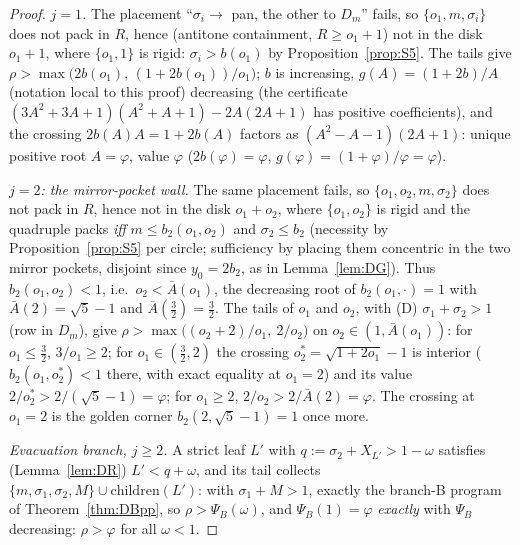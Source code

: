 \documentclass[10pt,a4paper]{amsart}
\begin{document}
\begin{proof}
\emph{$j=1$.} The placement ``$\sigma_i\to$ pan, the other to $D_m$''
fails, so $\{o_1,m,\sigma_i\}$ does not pack in $R$, hence (antitone
containment, $R\ge o_1+1$) not in the disk $o_1+1$, where
$\{o_1,1\}$ is rigid: $\sigma_i>b(o_1)$ by
Proposition~\ref{prop:S5}. The tails give
$\rho>\max\bigl(2b(o_1),\,(1+2b(o_1))/o_1\bigr)$; $b$ is increasing,
$g(A)=(1+2b)/A$ (notation local to this proof) decreasing (the certificate
$(3A^2+3A+1)(A^2+A+1)-2A(2A+1)$ has positive coefficients), and the
crossing $2b(A)A=1+2b(A)$ factors as $(A^2-A-1)(2A+1)$: unique positive
root $A=\varphi$, value $\varphi$ ($2b(\varphi)=\varphi$,
$g(\varphi)=(1+\varphi)/\varphi=\varphi$).

\emph{$j=2$: the mirror-pocket wall.} The same placement fails, so
$\{o_1,o_2,m,\sigma_2\}$ does not pack in $R$, hence not in the disk
$o_1+o_2$, where $\{o_1,o_2\}$ is rigid and the quadruple packs
\emph{iff} $m\le b_2(o_1,o_2)$ and $\sigma_2\le b_2$ (necessity by
Proposition~\ref{prop:S5} per circle; sufficiency by placing them
concentric in the two mirror pockets, disjoint since $y_0=2b_2$, as in
Lemma~\ref{lem:DG}). Thus $b_2(o_1,o_2)<1$, i.e.\ $o_2<\bar A(o_1)$,
the decreasing root of $b_2(o_1,\cdot)=1$ with $\bar A(2)=\sqrt5-1$ and
$\bar A(\tfrac32)=\tfrac32$. The tails of $o_1$ and $o_2$, with (D)
$\sigma_1+\sigma_2>1$ (row in $D_m$), give
$\rho>\max\bigl((o_2+2)/o_1,\ 2/o_2\bigr)$ on $o_2\in(1,\bar A(o_1))$:
for $o_1\le\tfrac32$, $3/o_1\ge2$; for $o_1\in(\tfrac32,2)$ the
crossing $o_2^\ast=\sqrt{1+2o_1}-1$ is interior
($b_2(o_1,o_2^\ast)<1$ there, with exact equality at $o_1=2$) and its
value $2/o_2^\ast>2/(\sqrt5-1)=\varphi$; for $o_1\ge2$,
$2/o_2>2/\bar A(2)=\varphi$. The crossing at $o_1=2$ is the golden
corner $b_2(2,\sqrt5-1)=1$ once more.

\emph{Evacuation branch, $j\ge2$.} A strict leaf $L'$ with
$q:=\sigma_2+X_{L'}>1-\omega$ satisfies (Lemma~\ref{lem:DR})
$L'<q+\omega$, and its tail collects $\{m,\sigma_1,\sigma_2,M\}\cup
\mathrm{children}(L')$: with $\sigma_1+M>1$, exactly the branch-B
program of Theorem~\ref{thm:DBpp}, so $\rho>\Psi_B(\omega)$, and
$\Psi_B(1)=\varphi$ \emph{exactly} with $\Psi_B$ decreasing:
$\rho>\varphi$ for all $\omega<1$.


\end{proof}
\end{document}
